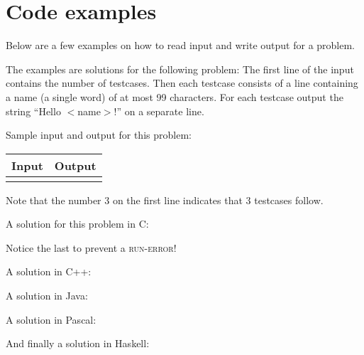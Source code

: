 \newpage
\appendix

\section{Code examples}\label{codeexamples}

Below are a few examples on how to read input and write output for a
problem.

The examples are solutions for the following problem: The first line
of the input contains the number of testcases. Then each testcase
consists of a line containing a name (a single word) of at most 99
characters. For each testcase output the string ``Hello $<$name$>$!''
on a separate line.

Sample input and output for this problem:

\begin{tabular}{|p{}|p{}|}
\hline
\textbf{Input} & \textbf{Output} \\
\hline
 &
 \\
\hline
\end{tabular}

Note that the number 3 on the first line indicates that 3 testcases
follow.

A solution for this problem in C:

Notice the last  to prevent a \textsc{run-error}!

\newpage

A solution in C++:

A solution in Java:

\newpage

A solution in Pascal:

And finally a solution in Haskell:


